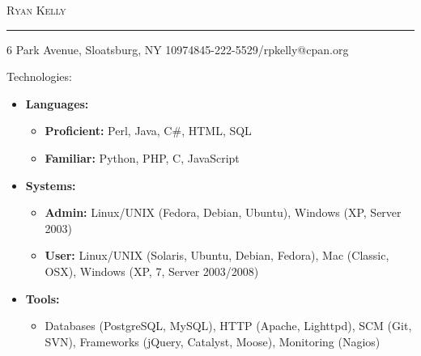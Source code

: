 \documentclass[10pt,oneside]{article}
\makeatletter
\newcommand{\name}{Ryan Kelly}
\newcommand{\addr}{6 Park Avenue, Sloatsburg, NY 10974}
\newcommand{\phone}{845-222-5529}
\newcommand{\email}{rpkelly@cpan.org}
\newcommand{\bigname}[1]{
	\begin{flushleft}\fontfamily{phv}\selectfont\Huge\scshape#1\end{flushleft}
}
\newenvironment{ressection}[1]{
	\vspace{1pt}
	{\fontfamily{phv}\selectfont\Large#1}
	\begin{itemize}
	\vspace{1pt}
}{
	\end{itemize}
}
\newcommand{\resitem}[1]{
	\vspace{-4pt}
	\item \begin{flushleft} #1 \end{flushleft}
}
\newcommand{\ressubitem}[1]{
	\vspace{-2pt}
	\item \begin{flushleft} #1 \end{flushleft}
}
\newenvironment{reslist}[1]{
	\resitem{\textbf{#1}}
	\vspace{-5pt}
	\begin{itemize}
}{
	\end{itemize}
}
\makeatother
\begin{document}
 \selectfont

\bigname{\name}

\vspace{-8pt} \rule{\textwidth}{1pt}

\vspace{-1pt} {\small \addr \hfill \phone/\email}

\vspace{8 pt}

\begin{ressection}{Technologies:}

    \begin{reslist}{Languages:}
        \ressubitem{\textbf{Proficient:} Perl, Java, C\#, HTML, SQL}
        \ressubitem{\textbf{Familiar:} Python, PHP, C, JavaScript}
    \end{reslist}

    \begin{reslist}{Systems:}
        \ressubitem{\textbf{Admin:} Linux/UNIX (Fedora, Debian, Ubuntu), Windows (XP, Server 2003)}
        \ressubitem{\textbf{User:} Linux/UNIX (Solaris, Ubuntu, Debian, Fedora), Mac (Classic, OSX), Windows (XP, 7, Server 2003/2008)}
    \end{reslist}

    \begin{reslist}{Tools:}
       \ressubitem{Databases (PostgreSQL, MySQL), HTTP (Apache, Lighttpd), SCM (Git, SVN), Frameworks (jQuery, Catalyst, Moose), Monitoring (Nagios)} 
    \end{reslist}

\end{ressection}
\end{document}
